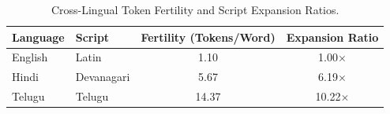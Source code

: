 \begin{table}[t]
\centering
\caption{Cross-Lingual Token Fertility and Script Expansion Ratios.}
\label{tab:token_fertility}
\begin{tabular}{llcc}
\toprule
\textbf{Language} & \textbf{Script} & \textbf{Fertility (Tokens/Word)} & \textbf{Expansion Ratio} \\
\midrule
English & Latin & 1.10 & 1.00$\times$ \\
Hindi & Devanagari & 5.67 & 6.19$\times$ \\
Telugu & Telugu & 14.37 & 10.22$\times$ \\
\bottomrule
\end{tabular}
\end{table}
